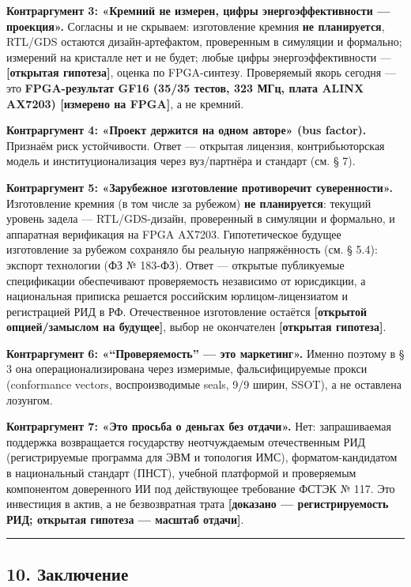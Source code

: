 \documentclass[
  russian,
]{article}
\begin{document}
\textbf{Контраргумент 3: «Кремний не измерен, цифры энергоэффективности
--- проекция».} Согласны и не скрываем: изготовление кремния \textbf{не
планируется}, RTL/GDS остаются дизайн-артефактом, проверенным в симуляции и
формально; измерений на кристалле нет и не будет; любые цифры
энергоэффективности --- \textbf{{[}открытая гипотеза{]}}, оценка по
FPGA-синтезу. Проверяемый
якорь сегодня --- это \textbf{FPGA-результат GF16 (35/35 тестов, 323
МГц, плата ALINX AX7203) {[}измерено на FPGA{]}}, а не кремний.

\textbf{Контраргумент 4: «Проект держится на одном авторе» (bus
factor).} Признаём риск устойчивости. Ответ --- открытая лицензия,
контрибьюторская модель и институционализация через вуз/партнёра и
стандарт (см. § 7).

\textbf{Контраргумент 5: «Зарубежное изготовление противоречит
суверенности».} Изготовление кремния (в том числе за рубежом) \textbf{не
планируется}: текущий уровень задела --- RTL/GDS-дизайн, проверенный в
симуляции и формально, и аппаратная верификация на FPGA AX7203. Гипотетическое
будущее изготовление за рубежом сохраняло бы реальную напряжённость (см. § 5.4):
экспорт технологии (ФЗ № 183-ФЗ). Ответ --- открытые
публикуемые спецификации обеспечивают проверяемость независимо от
юрисдикции, а национальная приписка решается российским
юрлицом-лицензиатом и регистрацией РИД в РФ. Отечественное изготовление
остаётся \textbf{{[}открытой опцией/замыслом на будущее{]}}, выбор не окончателен
\textbf{{[}открытая гипотеза{]}}.

\textbf{Контраргумент 6: «``Проверяемость'' --- это маркетинг».} Именно
поэтому в § 3 она операционализирована через измеримые, фальсифицируемые
прокси (conformance vectors, воспроизводимые seals, 9/9 ширин, SSOT), а
не оставлена лозунгом.

\textbf{Контраргумент 7: «Это просьба о деньгах без отдачи».} Нет:
запрашиваемая поддержка возвращается государству неотчуждаемым
отечественным РИД (регистрируемые программа для ЭВМ и топология ИМС),
форматом-кандидатом в национальный стандарт (ПНСТ), учебной платформой и
проверяемым компонентом доверенного ИИ под действующее требование ФСТЭК
№ 117. Это инвестиция в актив, а не безвозвратная трата
\textbf{{[}доказано --- регистрируемость РИД; открытая гипотеза ---
масштаб отдачи{]}}.

\begin{center}\rule{0.5\linewidth}{0.5pt}\end{center}

\subsection{10.
Заключение}\label{ux437ux430ux43aux43bux44eux447ux435ux43dux438ux435}
\end{document}

